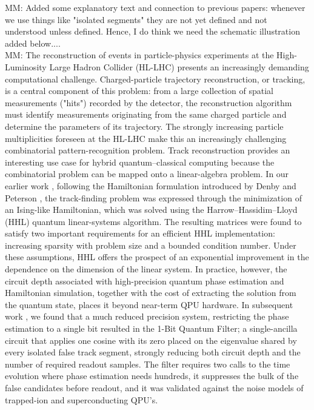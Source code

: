 \documentclass[11pt,a4paper]{article}
\newcommand{\mm}[1]{{\color{purple} MM: #1 }}
\begin{document}
\mm{Added some explanatory text and connection to previous papers: whenever we use things like "isolated segments" they are not yet defined and not understood unless defined. Hence, I do think we need the schematic illustration added below....} \\
\mm{
The reconstruction of events in particle-physics experiments at the High-Luminosity Large Hadron Collider (HL-LHC) presents an increasingly demanding computational challenge. Charged-particle trajectory reconstruction, or tracking, is a central component of this problem: from a large collection of spatial measurements ("hits") recorded by the detector, the reconstruction algorithm must identify measurements originating from the same charged particle and determine the parameters of its trajectory. The strongly increasing particle multiplicities foreseen at the HL-LHC make this an increasingly challenging combinatorial pattern-recognition problem.
Track reconstruction provides an interesting use case for hybrid quantum--classical computing because the combinatorial problem can be mapped onto a linear-algebra problem. In our earlier work \cite{Nicotra}, following the Hamiltonian formulation introduced by Denby and Peterson \cite{Denby,Peterson}, the track-finding problem was expressed through the minimization of an Ising-like Hamiltonian, which was solved using the Harrow--Hassidim--Lloyd (HHL) quantum linear-systems algorithm. The resulting matrices were found to satisfy two important requirements for an efficient HHL implementation: increasing sparsity with problem size and a bounded condition number. Under these assumptions, HHL offers the prospect of an exponential improvement in the dependence on the dimension of the linear system. In practice, however, the circuit depth associated with high-precision quantum phase estimation and Hamiltonian simulation, together with the cost of extracting the solution from the quantum state, places it beyond near-term QPU hardware.
In subsequent work \cite{Chiotopoulos}, we found that 
a much reduced precision system, restricting the phase estimation to a single bit resulted in the 1-Bit Quantum Filter; a single-ancilla circuit that applies one cosine with its zero placed on the eigenvalue shared by every isolated false track segment, strongly reducing both circuit depth and the number of required readout samples.
The filter requires two calls to the time
evolution where phase estimation needs hundreds, it suppresses the bulk of the false candidates
before readout, and it was validated against the noise models of trapped-ion and superconducting QPU's. 
}
\end{document}
